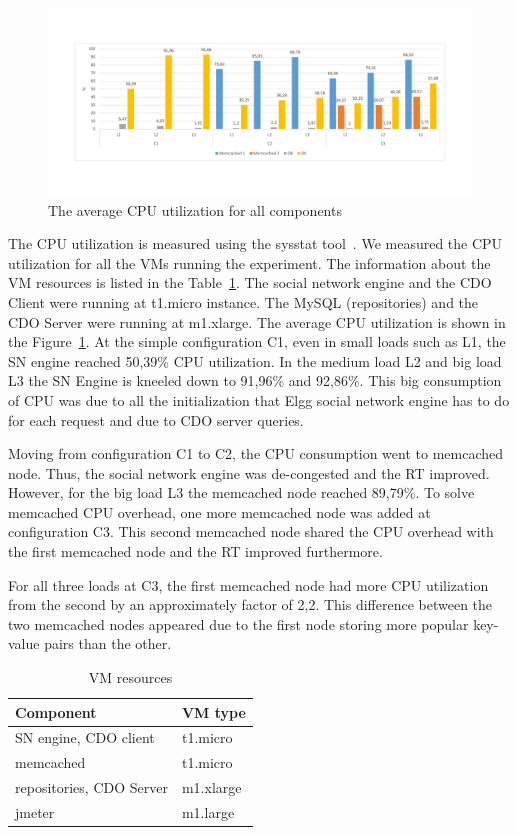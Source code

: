 \begin{figure}[h]
	\centering
	\includegraphics[width=1.1\textwidth,natwidth=200,natheight=250]{./fig/UsageAVG.pdf} 
	\caption{The average CPU utilization for all components}
	\label{fig:cpuavg}
\end{figure}

The CPU utilization is measured using the sysstat tool~\cite{sysstat_url}. We measured the CPU utilization for all the VMs running the experiment. The information about the VM resources is listed in the Table~\ref{vms_resources}. The social network engine and the CDO Client were running at t1.micro instance. The MySQL (repositories) and the CDO Server were running at m1.xlarge. The average CPU utilization is shown in the Figure~\ref{fig:cpuavg}. At the simple configuration C1, even in small loads such as L1, the SN engine reached 50,39\% CPU utilization. In the medium load L2 and big load L3 the SN Engine is kneeled down to 91,96\% and 92,86\%. This big consumption of CPU was due to all the initialization that Elgg social network engine has to do for each request and due to CDO server queries.

Moving from configuration C1 to C2, the CPU consumption went to memcached node. Thus, the social network engine was de-congested and the RT improved. However, for the big load L3 the memcached node reached 89,79\%. To solve memcached CPU overhead, one more memcached node was added at configuration C3. This second memcached node shared the CPU overhead with the first memcached node and the RT improved furthermore. 

For all three loads at C3, the first memcached node had more CPU utilization from the second by an approximately factor of 2,2. This difference between the two memcached nodes appeared due to the first node storing more popular key-value pairs than the other.

\begin{table}[]
\centering
\begin{tabular}{|l|l|}
\hline
 Component &  VM type \\ \hline
 SN engine, CDO client &  t1.micro \\ \hline
 memcached &  t1.micro \\ \hline
 repositories, CDO Server &  m1.xlarge \\ \hline
 jmeter &  m1.large \\ \hline
\end{tabular}
\caption{VM resources}
\label{vms_resources}
\end{table}

